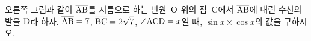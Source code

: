 \noindent\begin{minipage}[t]{0.58\linewidth}\vspace{0pt}\raggedright 오른쪽 그림과 같이 $\overline{\mathrm{AB}}$를 지름으로 하는 반원~$\mathrm{O}$ 위의 점~$\mathrm{C}$에서 $\overline{\mathrm{AB}}$에 내린 수선의 발을 $\mathrm{D}$라 하자. $\overline{\mathrm{AB}}=7$, $\overline{\mathrm{BC}}=2\sqrt{7}$, $\angle\mathrm{ACD}=x$일 때, $\sin x\times\cos x$의 값을 구하시오.\end{minipage}\hfill\begin{minipage}[t]{0.4\linewidth}\vspace{0pt}\centering \resizebox{\ifdim\width>\linewidth\linewidth\else\width\fi}{!}{}\end{minipage}\par
